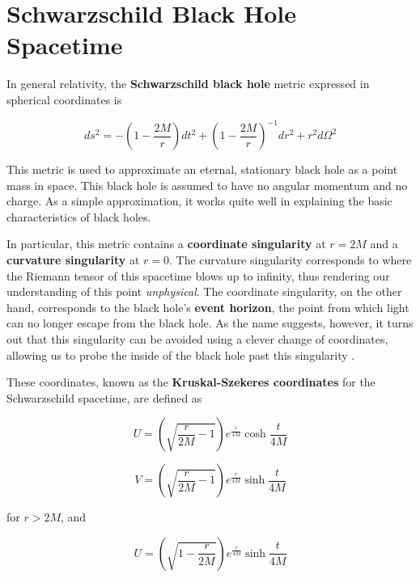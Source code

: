 \documentclass{article}
\begin{document}
\section{Schwarzschild Black Hole Spacetime}

In general relativity, the \textbf{Schwarzschild black hole} metric expressed in spherical coordinates is

\begin{equation}
    ds^{2} = -\left(1-\frac{2M}{r}\right)dt^{2} + \left(1-\frac{2M}{r}\right)^{-1}dr^{2} + r^{2}d\Omega^{2}
\end{equation}

This metric is used to approximate an eternal, stationary black hole as a point mass in space. This black hole is assumed to have no angular momentum and no charge. As a simple approximation, it works quite well in explaining the basic characteristics of black holes.

In particular, this metric contains a \textbf{coordinate singularity} at $r = 2M$ and a \textbf{curvature singularity} at $r = 0$. The curvature singularity corresponds to where the Riemann tensor of this spacetime blows up to infinity, thus rendering our understanding of this point \textit{unphysical}. The coordinate singularity, on the other hand, corresponds to the black hole's \textbf{event horizon}, the point from which light can no longer escape from the black hole. As the name suggests, however, it turns out that this singularity can be avoided using a clever change of coordinates, allowing us to probe the inside of the black hole past this singularity \cite{schutz}.

These coordinates, known as the \textbf{Kruskal-Szekeres coordinates} for the Schwarzschild spacetime, are defined as \cite{schutz}\cite{tikz_penrose}

\begin{equation}
    U = \left(\sqrt{\frac{r}{2M} - 1}\right)e^{\frac{r}{4M}}\cosh{\frac{t}{4M}}
\end{equation}

\begin{equation}
    V = \left(\sqrt{\frac{r}{2M} - 1}\right)e^{\frac{r}{4M}}\sinh{\frac{t}{4M}}
\end{equation}

for $r > 2M$, and

\begin{equation}
    U = \left(\sqrt{1 - \frac{r}{2M}}\right)e^{\frac{r}{4M}}\sinh{\frac{t}{4M}}
\end{equation}
\end{document}
